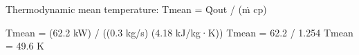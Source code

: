 Thermodynamic mean temperature:  
Tmean = Q̇out / (ṁ cp)  

Tmean = (62.2 kW) / ((0.3 kg/s) (4.18 kJ/kg·K))  
Tmean = 62.2 / 1.254  
Tmean = 49.6 K
